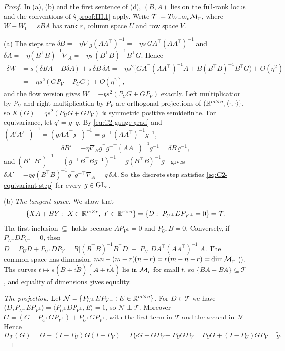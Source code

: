 \begin{proof}
In (a), (b) and the first sentence of (d), $(B,A)$ lies on the full-rank locus and the conventions of
\S\ref{proof:III.1} apply. Write $\mathcal T:=T_{W-W_0}\mathcal{M}_r$, where $W-W_0=sBA$ has rank $r$, column space $U$ and row
space $V$.

(a) The steps are $\delta B=-\eta\nabla_B(AA^\top)^{-1}=-\eta s\,GA^\top(AA^\top)^{-1}$ and
$\delta A=-\eta(B^\top B)^{-1}\nabla_A=-\eta s\,(B^\top B)^{-1}B^\top G$. Hence
\begin{align*}
\delta W&=s(\delta BA+B\delta A)+s\,\delta B\,\delta A=-\eta s^2\big(GA^\top(AA^\top)^{-1}A+B(B^\top B)^{-1}B^\top G\big)+O(\eta^2)\\
&=-\eta s^2(GP_V+P_UG)+O(\eta^2),
\end{align*}
and the flow version gives $\dot W=-\eta s^2(P_UG+GP_V)$ exactly. Left multiplication by $P_U$ and right
multiplication by $P_V$ are orthogonal projections of $(\mathbb{R}^{m\times n},\langle\cdot,\cdot\rangle)$, so
$K(G)=\eta s^2(P_UG+GP_V)$ is symmetric positive semidefinite. For equivariance, let $q'=g\cdot q$. By
\eqref{eq:C2-gauge-grad} and $(A'A'^\top)^{-1}=(gAA^\top g^\top)^{-1}=g^{-\top}(AA^\top)^{-1}g^{-1}$,
\[\delta B'=-\eta\nabla_Bg^\top g^{-\top}(AA^\top)^{-1}g^{-1}=\delta B\,g^{-1},\]
and $(B'^\top B')^{-1}=(g^{-\top}B^\top Bg^{-1})^{-1}=g(B^\top B)^{-1}g^\top$ gives
$\delta A'=-\eta g(B^\top B)^{-1}g^\top g^{-\top}\nabla_A=g\,\delta A$. So the discrete step satisfies
\eqref{eq:C2-equivariant-step} for every $g\in\mathrm{GL}_r$.

(b) \emph{The tangent space.} We show that
\[\{XA+BY:\ X\in\mathbb{R}^{m\times r},\ Y\in\mathbb{R}^{r\times n}\}=\{D:\ P_{U^\perp}DP_{V^\perp}=0\}=\mathcal T.\]
The first inclusion $\subseteq$ holds because $AP_{V^\perp}=0$ and $P_{U^\perp}B=0$. Conversely, if
$P_{U^\perp}DP_{V^\perp}=0$, then
$D=P_UD+P_{U^\perp}DP_V=B\big[(B^\top B)^{-1}B^\top D\big]+\big[P_{U^\perp}DA^\top(AA^\top)^{-1}\big]A$. The common space
has dimension $mn-(m-r)(n-r)=r(m+n-r)=\dim\mathcal{M}_r$ (). The curves $t\mapsto s(B+t\dot B)(A+t\dot A)$ lie in
$\mathcal{M}_r$ for small $t$, so $\{\dot BA+B\dot A\}\subseteq\mathcal T$, and equality of dimensions gives equality.

\emph{The projection.} Let $\mathcal N=\{P_{U^\perp}EP_{V^\perp}:E\in\mathbb{R}^{m\times n}\}$. For $D\in\mathcal T$ we
have $\langle D,P_{U^\perp}EP_{V^\perp}\rangle=\langle P_{U^\perp}DP_{V^\perp},E\rangle=0$, so
$\mathcal N\perp\mathcal T$. Moreover $G=(G-P_{U^\perp}GP_{V^\perp})+P_{U^\perp}GP_{V^\perp}$, with the first term in
$\mathcal T$ and the second in $\mathcal N$. Hence
\[\Pi_{\mathcal T}(G)=G-(I-P_U)G(I-P_V)=P_UG+GP_V-P_UGP_V=P_UG+(I-P_U)GP_V=\tilde g.\]


\end{proof}
